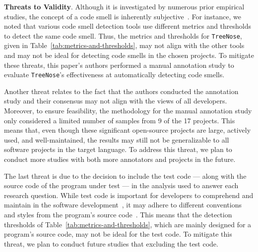 {\bf Threats to Validity}.
%
Although it is investigated by numerous prior empirical studies, the concept of
a code smell is inherently subjective~\cite{Fowler_Beck}.
%
For instance, we noted that various code smell detection tools use different
metrics and thresholds to detect the same code smell. Thus, the metrics and
thresholds for \texttt{TreeNose}, given in
Table~\ref{tab:metrics-and-thresholds}, may not align with the other tools and
may not be ideal for detecting code smells in the chosen projects.
%
%
To mitigate these threats, this paper's authors performed a manual annotation
study to evaluate \texttt{TreeNose}'s effectiveness at automatically detecting
code smells.

%
Another threat relates to the fact that the authors conducted the annotation
study and their consensus may not align with the views of all developers.
%
Moreover, to ensure feasibility, the methodology for the manual annotation study
only considered a limited number of samples from 9 of the 17 projects.
%
This means that, even though these significant open-source projects are large,
actively used, and well-maintained, the results may still not be generalizable
to all software projects in the target language. To address this threat, we plan
to conduct more studies with both more annotators and projects in the future.






The last threat is due to the decision to include the test code --- along with
the source code of the program under test --- in the analysis used to answer
each research question. While test code is important for developers to
comprehend and maintain in the software development~\cite{ML}, it may adhere to
different conventions and styles from the program's source
code~\cite{Kapfhammer2004,Kapfhammer2010}. This means that the detection
thresholds of Table~\ref{tab:metrics-and-thresholds}, which are mainly designed
for a program's source code, may not be ideal for the test code. To mitigate
this threat, we plan to conduct future studies that excluding the test code.
